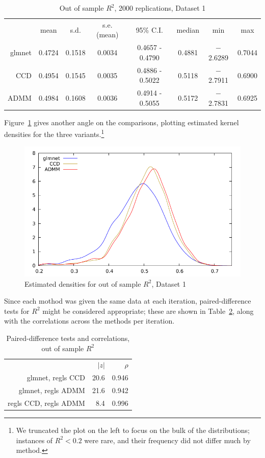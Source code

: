 \documentclass{article}
\begin{document}
\begin{table}[htbp]
  \centering
  \begin{tabular}{rccccccc}
 & mean & s.d. & s.e.(mean) & 95\% C.I. & median & min & max \\
      glmnet & 0.4724 & 0.1518 & 0.0034 & 0.4657 - 0.4790 & 0.4881 & $-$2.6289 & 0.7044 \\
        CCD & 0.4954 & 0.1545 & 0.0035 & 0.4886 - 0.5022 & 0.5118 & $-$2.7911 & 0.6900 \\
       ADMM & 0.4984 & 0.1608 & 0.0036 & 0.4914 - 0.5055 & 0.5172 & $-$2.7831 & 0.6925 \\
  \end{tabular}
  \caption{Out of sample $R^2$, 2000 replications, Dataset 1}
  \label{tab:dset1}
\end{table}

Figure~\ref{fig:dset1} gives another angle on the comparisons,
plotting estimated kernel densities for the three
variants.\footnote{We truncated the plot on the left to focus on the
  bulk of the distributions; instances of $R^2 < 0.2$ were rare, and
  their frequency did not differ much by method.}

\begin{figure}[htbp]
  \centering
  \includegraphics[scale=0.9]{murder_kd3.pdf} 
  \caption{Estimated densities for out of sample $R^2$, Dataset 1}
  \label{fig:dset1}
\end{figure}

Since each mothod was given the same data at each iteration,
paired-difference tests for $R^2$ might be considered appropriate;
these are shown in Table~\ref{tab:paired}, along with the correlations
across the methods per iteration.

\begin{table}[htbp]
\begin{center}
  \begin{tabular}{rrr}
    & $|z|$ & $\rho$ \\[4pt]
glmnet, regls CCD & 20.6 & 0.946 \\
glmnet, regls ADMM & 21.6 & 0.942 \\
regls CCD, regls ADMM & 8.4 & 0.996 \\
  \end{tabular}
  \caption{Paired-difference tests and correlations, out of sample $R^2$}
  \label{tab:paired}  
\end{center}
\end{table}
\end{document}
